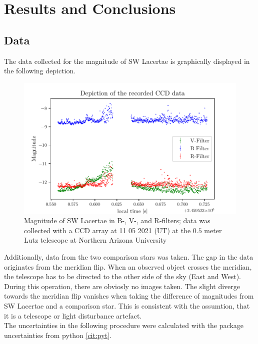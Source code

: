 \section{Results and Conclusions}
\label{sec:make}

\subsection{Data}
  \label{sec:America}
  The data collected for the magnitude of SW Lacertae is graphically displayed in the following depiction.
  \begin{figure}[H]
    \centering
    \includegraphics{Magnitude.pdf}
    \caption{Magnitude of SW Lacertae in B-, V-, and R-filters; 
    data was collected with a CCD array at 11 05 2021 (UT) at the $0.5$ meter Lutz telescope
    at Northern Arizona University}
  \end{figure}
  \noindent Additionally, data from the two comparison stars was taken. The gap in the data originates from 
  the meridian flip. When an observed object crosses the meridian, the telescope has to be directed 
  to the other side of the sky (East and West). During this operation, there are obviosly no
  images taken. The slight diverge towards the meridian flip vanishes when taking the 
  difference of magnitudes from SW Lacertae and a comparison star. This is consistent with the 
  assumtion, that it is a telescope or light disturbance artefact.\\
  \noindent The uncertainties in the following procedure were calculated with the package 
  uncertainties from python \ref{cit:pyt}.

